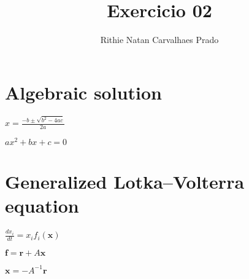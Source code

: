 \documentclass[a4paper, 20pt]{article}
\title{Exercicio 02}
\author{Rithie Natan Carvalhaes Prado}
\begin{document}
\maketitle

\section{Algebraic solution}

$x=\frac{-b \pm \sqrt {b^2-4ac}}{2a}$


$ax^2 + bx + c =0$


\section{Generalized Lotka–Volterra equation}

$\frac{dx_i}{dt} = x_i f_i(\mathbf{x})$


$\mathbf{f} = \mathbf{r} + A\mathbf{x}$


$\mathbf{x} = -A^{-1}\mathbf{r}$
\end{document}

